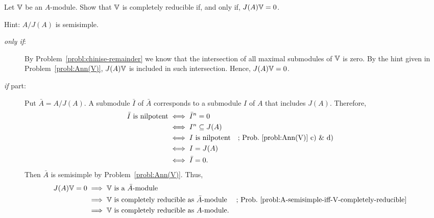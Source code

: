 \begin{probl}
    Let\/ $\mathbb V$ be an\/ $A$-module. Show that\/ $\mathbb V$ is completely reducible if, and only if, $J(A)\mathbb V=0$.

    \textrm{\rm Hint: $A/J(A)$ is semisimple}.
\end{probl}

\begin{solution}
    \begin{description}
        \item[\rm\textit{only if\/}:] By Problem~\ref{probl:chinise-remainder} we know that the intersection of all maximal submodules of $\mathbb V$ is zero. By the hint given in Problem~\ref{probl:Ann(V)}, $J(A)\mathbb V$ is included in such intersection. Hence, $J(A)\mathbb V=0$.

        \item[\rm\textit{if\/} part:] Put $\bar A=A/J(A)$. A submodule\/ $\bar{I}$ of\/ $\bar A$ corresponds to a submodule\/ $I$ of\/ $A$ that includes\/ $J(A)$. Therefore,
        \begin{align*}
            \bar{I} \text{ is nilpotent}
            &\iff \bar{I}^n = 0\\
            &\iff I^n \subseteq J(A)\\
            &\iff I\text{ is nilpotent}
                &&\text{; Prob.~\ref{probl:Ann(V)}~c)~\&~d)}\\
            &\iff I = J(A)\\
            &\iff \bar I=0.
        \end{align*}
        \normalsize
        Then $\bar A$ is semisimple by Problem~\ref{probl:Ann(V)}. Thus,
        \begin{align*}
            J(A)\mathbb V=0
                &\implies \mathbb V \text{ is a } \bar A\text{-module}\\
                &\implies \mathbb V \text{ is completely reducible as }
                    \bar A\text{-module}
                    &&\text{; Prob.~\ref{probl:A-semisimple-iff-V-completely-reducible}}\\
                &\implies \mathbb V \text{ is completely reducible as }
                    A\text{-module}.
        \end{align*}
        \normalsize
    \end{description}
\end{solution}